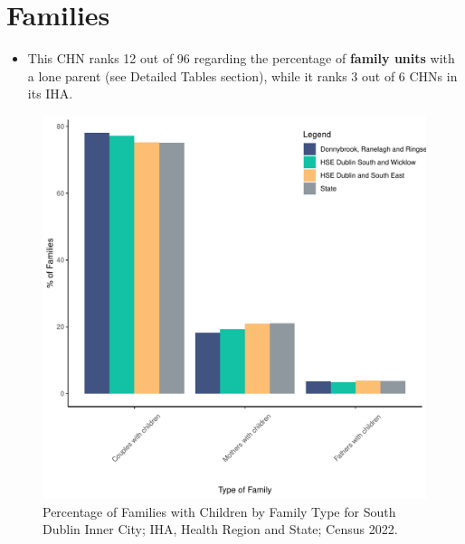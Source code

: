 \documentclass{article}
\begin{document}
\section{Families}\label{sect:Fam}
\begin{itemize}
\item This CHN ranks  12 out of 96 regarding the percentage of \textbf{family units} with a lone parent (see Detailed Tables section), while it ranks   3 out of 6 CHNs in its IHA.
\end{itemize}
\begin{figure}[H]
	\centering
	\includegraphics[width = 150mm]{../figures/FamED.pdf}
	\caption{Percentage of Families with Children by Family Type for South Dublin Inner City; IHA, Health Region and State; Census 2022.}
	\label{fig:vbnv}
	\end{figure}
	
\end{document}
